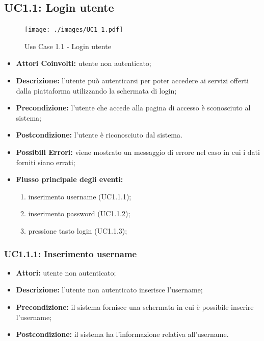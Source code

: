 \subsection{UC1.1: Login utente}

\begin{figure}[htbp]
    \centering
    \centerline{\texttt{[image: ./images/UC1\_1.pdf]}}
    \caption{Use Case 1.1 - Login utente}
\end{figure}


\begin{itemize}
    \item \textbf{Attori Coinvolti:}
    	utente non autenticato;
    \item \textbf{Descrizione:}
    	l'utente può autenticarsi per poter accedere ai servizi offerti dalla piattaforma utilizzando la schermata di login;
    \item \textbf{Precondizione:}
        l'utente che accede alla pagina di accesso è sconosciuto al sistema;
    \item \textbf{Postcondizione:}
    	l'utente è riconosciuto dal sistema.
    \item \textbf{Possibili Errori:}
    	viene mostrato un messaggio di errore nel caso in cui i dati forniti siano errati;
    \item \textbf{Flusso principale degli eventi:}

    \begin{enumerate}
        \item inserimento username (UC1.1.1);
        \item inserimento password (UC1.1.2);
        \item pressione tasto login (UC1.1.3);
    \end{enumerate}

\end{itemize}

\subsubsection{UC1.1.1: Inserimento username}

\begin{itemize}
    \item \textbf{Attori:} utente non autenticato;
    \item \textbf{Descrizione:} l'utente non autenticato inserisce l'username;
    \item \textbf{Precondizione:} il sistema fornisce una schermata in cui è possibile inserire l’username;
    \item \textbf{Postcondizione:} il sistema ha l'informazione relativa all'username.
\end{itemize}

